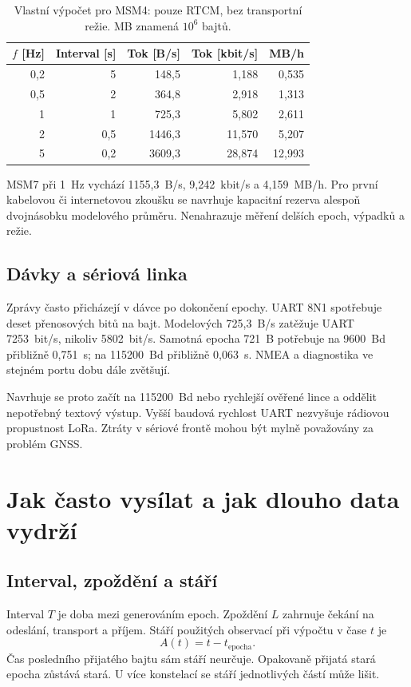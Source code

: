\documentclass[11pt,a4paper]{article}
\begin{document}
\par
\begin{table}[htbp]\centering\small
\caption{Vlastní výpočet pro MSM4: pouze RTCM, bez transportní režie. MB znamená $10^6$ bajtů.}
\begin{tabular}{rrrrr}\toprule
$f$ [Hz] & Interval [s] & Tok [B/s] & Tok [kbit/s] & MB/h\\\midrule
0,2 & 5 & 148,5 & 1,188 & 0,535\\
0,5 & 2 & 364,8 & 2,918 & 1,313\\
1 & 1 & 725,3 & 5,802 & 2,611\\
2 & 0,5 & 1446,3 & 11,570 & 5,207\\
5 & 0,2 & 3609,3 & 28,874 & 12,993\\
\bottomrule\end{tabular}\end{table}
\par
MSM7 při 1~Hz vychází 1155,3~B/s, 9,242~kbit/s a 4,159~MB/h. Pro první kabelovou či internetovou zkoušku se navrhuje kapacitní rezerva alespoň dvojnásobku modelového průměru. Nenahrazuje měření delších epoch, výpadků a režie.

\subsection{Dávky a sériová linka}
Zprávy často přicházejí v dávce po dokončení epochy. UART 8N1 spotřebuje deset přenosových bitů na bajt. Modelových 725,3~B/s zatěžuje UART 7253~bit/s, nikoliv 5802~bit/s. Samotná epocha 721~B potřebuje na 9600~Bd přibližně 0,751~s; na 115200~Bd přibližně 0,063~s. NMEA a diagnostika ve stejném portu dobu dále zvětšují.

Navrhuje se proto začít na 115200~Bd nebo rychlejší ověřené lince a oddělit nepotřebný textový výstup. Vyšší baudová rychlost UART nezvyšuje rádiovou propustnost LoRa. Ztráty v sériové frontě mohou být mylně považovány za problém GNSS.

\section{Jak často vysílat a jak dlouho data vydrží}
\subsection{Interval, zpoždění a stáří}
Interval $T$ je doba mezi generováním epoch. Zpoždění $L$ zahrnuje čekání na odeslání, transport a příjem. Stáří použitých observací při výpočtu v čase $t$ je
\begin{equation}
 A(t)=t-t_{\mathrm{epocha}}.
\end{equation}
Čas posledního přijatého bajtu sám stáří neurčuje. Opakovaně přijatá stará epocha zůstává stará. U více konstelací se stáří jednotlivých částí může lišit.
\end{document}
